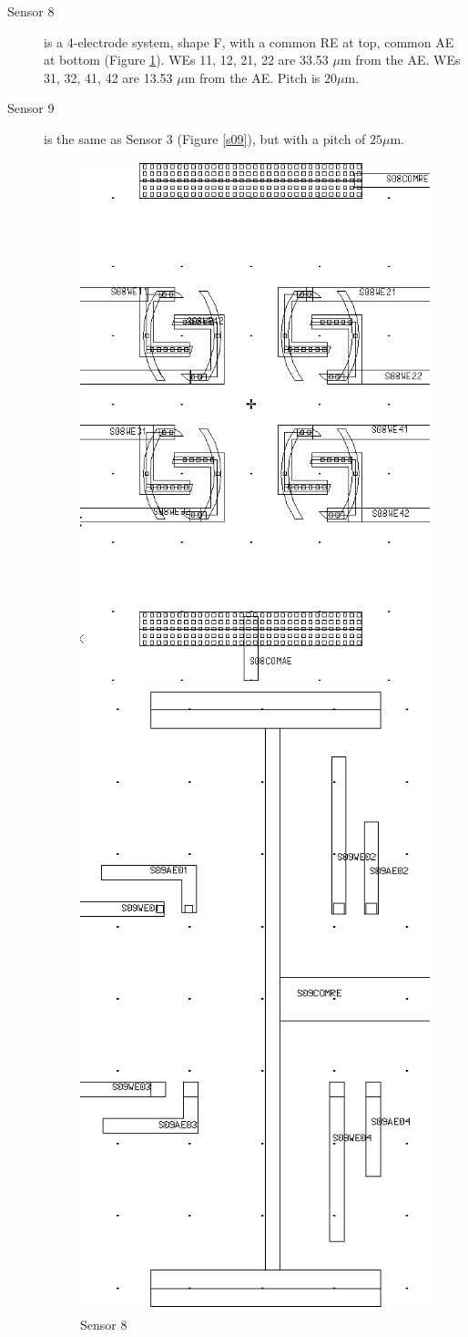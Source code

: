 \begin{description}
\item[Sensor 8] is a 4-electrode system, shape F, with a common RE at top, common AE at bottom (Figure \ref{s08}). WEs 11, 12, 21, 22 are 33.53 $\mu \mathrm{m}$ from the AE. WEs 31, 32, 41, 42 are 13.53 $\mu \mathrm{m}$ from the AE. Pitch is $20 \mu \mathrm{m}$.
\item[Sensor 9] is the same as Sensor 3 (Figure \ref{s09}), but with a pitch of $25 \mu \mathrm{m}$.

\begin{figure}
	\begin{minipage}{0.5\linewidth}
		\centering
		\includegraphics[width=0.6\linewidth]{figures/s08.png}
		\caption{Sensor 8}
		\label{s08}
	\end{minipage}
	\begin{minipage}{0.5\linewidth}
		\centering
		\includegraphics[width=0.6\linewidth]{figures/s09.png}

\end{minipage}
\end{figure}
\end{description}
